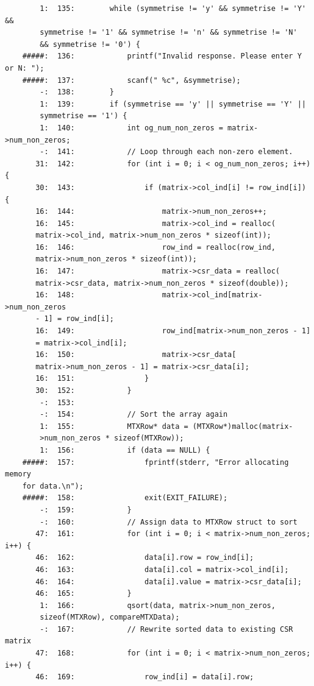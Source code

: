 \documentclass[12pt]{article}
\begin{document}
\begin{mdframed}[style=myboxstyleTerminal1]
\begin{verbatim}
        1:  135:        while (symmetrise != 'y' && symmetrise != 'Y' &&
        symmetrise != '1' && symmetrise != 'n' && symmetrise != 'N' 
        && symmetrise != '0') {
    #####:  136:            printf("Invalid response. Please enter Y or N: ");
    #####:  137:            scanf(" %c", &symmetrise);
        -:  138:        }
        1:  139:        if (symmetrise == 'y' || symmetrise == 'Y' || 
        symmetrise == '1') {
        1:  140:            int og_num_non_zeros = matrix->num_non_zeros;
        -:  141:            // Loop through each non-zero element.
       31:  142:            for (int i = 0; i < og_num_non_zeros; i++) {
       30:  143:                if (matrix->col_ind[i] != row_ind[i]) {
       16:  144:                    matrix->num_non_zeros++;
       16:  145:                    matrix->col_ind = realloc(
       matrix->col_ind, matrix->num_non_zeros * sizeof(int));
       16:  146:                    row_ind = realloc(row_ind, 
       matrix->num_non_zeros * sizeof(int));
       16:  147:                    matrix->csr_data = realloc(
       matrix->csr_data, matrix->num_non_zeros * sizeof(double));
       16:  148:                    matrix->col_ind[matrix->num_non_zeros
       - 1] = row_ind[i];
       16:  149:                    row_ind[matrix->num_non_zeros - 1]
       = matrix->col_ind[i];
       16:  150:                    matrix->csr_data[
       matrix->num_non_zeros - 1] = matrix->csr_data[i];
       16:  151:                }
       30:  152:            }
        -:  153:
        -:  154:            // Sort the array again
        1:  155:            MTXRow* data = (MTXRow*)malloc(matrix-
        >num_non_zeros * sizeof(MTXRow));
        1:  156:            if (data == NULL) {
    #####:  157:                fprintf(stderr, "Error allocating memory 
    for data.\n");
    #####:  158:                exit(EXIT_FAILURE);
        -:  159:            }
        -:  160:            // Assign data to MTXRow struct to sort
       47:  161:            for (int i = 0; i < matrix->num_non_zeros; i++) {
       46:  162:                data[i].row = row_ind[i];
       46:  163:                data[i].col = matrix->col_ind[i];
       46:  164:                data[i].value = matrix->csr_data[i];
       46:  165:            }
        1:  166:            qsort(data, matrix->num_non_zeros, 
        sizeof(MTXRow), compareMTXData);
        -:  167:            // Rewrite sorted data to existing CSR matrix
       47:  168:            for (int i = 0; i < matrix->num_non_zeros; i++) {
       46:  169:                row_ind[i] = data[i].row;

\end{verbatim}
\end{mdframed}
\end{document}
